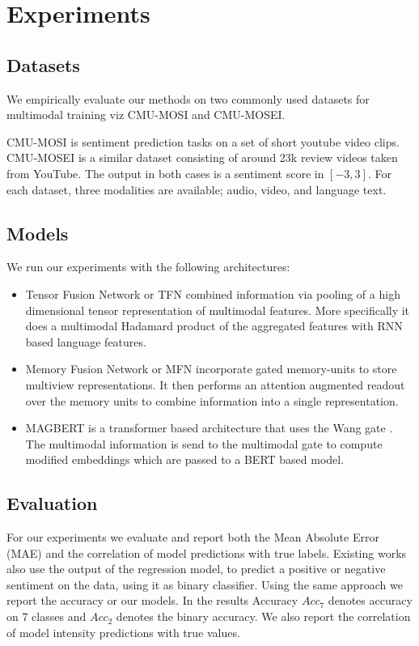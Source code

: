 \documentclass[letterpaper]{article} %
\begin{document}
\section{Experiments}

\subsection{Datasets}
We empirically evaluate our methods on two commonly used datasets for multimodal training viz CMU-MOSI and CMU-MOSEI.

CMU-MOSI \citep{wollmer2013youtube} is sentiment prediction tasks on a set of short youtube video clips. CMU-MOSEI \citep{zadeh2018multi} is a similar dataset consisting of around 23k review videos taken from YouTube. The output in both cases is a sentiment score in $[-3,3]$. For each dataset, three modalities are available; audio, video, and language text.


\subsection{Models}
We run our experiments with the following architectures:
\begin{itemize}
    \item Tensor Fusion Network or TFN \cite{zadeh2017tensor} combined information via pooling of a high dimensional tensor representation of multimodal features. More specifically it does a multimodal Hadamard product of the aggregated features with RNN based language features.
    \item Memory Fusion Network or MFN \citep{zadeh2018memory} incorporate gated memory-units to store multiview representations. It then performs an attention augmented readout over the memory units to combine information into a single representation.
    \item MAGBERT \citep{rahman2020integrating} is a transformer based architecture that uses the Wang gate \citep{wang2019words}. The multimodal information is send to the multimodal gate to compute modified embeddings which are passed to a BERT \citep{devlin2018bert} based model.
\end{itemize}


\subsection{Evaluation}
For our experiments we evaluate and report both the Mean Absolute Error (MAE) and the correlation of model predictions with true labels. Existing works \citep{rahman2020integrating} also use the output of the regression model, to predict a positive or negative sentiment on the data, using it as binary classifier. Using the same approach we report the accuracy or our models. In the results Accuracy $Acc_{7}$ denotes accuracy on 7 classes and $Acc_{2}$ denotes the binary accuracy. We also report the correlation of model intensity predictions with true values.
\end{document}

